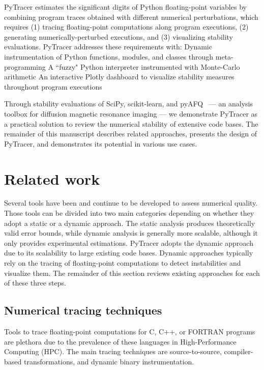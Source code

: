 \documentclass[11pt]{article}
\newcommand{\pytracer}[0]{PyTracer\xspace}
\begin{document}
PyTracer estimates the significant digits of Python floating-point variables by combining program traces obtained with different numerical perturbations, which requires (1) tracing floating-point computations along program executions, (2) generating numerically-perturbed executions, and (3) visualizing stability evaluations. PyTracer addresses these requirements with:
Dynamic instrumentation of Python functions, modules, and classes through meta-programming
A ``fuzzy" Python interpreter instrumented with Monte-Carlo arithmetic
An interactive Plotly dashboard to visualize stability measures throughout program executions

Through stability evaluations of 
SciPy, scikit-learn, and pyAFQ~\cite{kruper2021evaluating} --- an analysis toolbox for diffusion magnetic resonance imaging --- we demonstrate PyTracer as a practical solution to review the numerical stability of extensive code bases. The remainder of this manuscript describes related approaches, presents the design of PyTracer, and demonstrates its potential in various use cases.


\section{Related work}

Several tools have been and continue to be developed to assess numerical quality. Those tools can be divided into two main categories depending on whether they adopt a static or a dynamic approach.
The static analysis produces theoretically valid error bounds, while dynamic analysis is generally more scalable, although it only provides experimental estimations.
\pytracer adopts the dynamic approach due to its scalability to large existing code bases. Dynamic approaches typically rely on the tracing of floating-point computations to detect instabilities and visualize them. The remainder of this section reviews existing approaches for each of these three steps. 


\label{sec:soa}
\subsection{Numerical tracing techniques}
Tools to trace floating-point computations for C, C++, or FORTRAN programs are plethora due to the prevalence of these languages in High-Performance Computing (HPC). 
The main tracing techniques are source-to-source, compiler-based transformations, and dynamic binary instrumentation.
\end{document}
